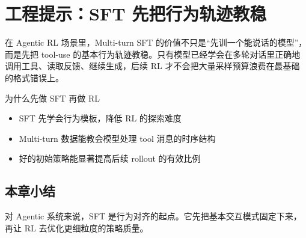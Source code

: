 \section{工程提示：SFT 先把行为轨迹教稳}
在 Agentic RL 场景里，Multi-turn SFT 的价值不只是“先训一个能说话的模型”，而是先把 tool-use 的基本行为轨迹教稳。只有模型已经学会在多轮对话里正确地调用工具、读取反馈、继续生成，后续 RL 才不会把大量采样预算浪费在最基础的格式错误上。

\begin{knowledgebox}{为什么先做 SFT 再做 RL}
\begin{itemize}
  \item SFT 先学会行为模板，降低 RL 的探索难度
  \item Multi-turn 数据能教会模型处理 tool 消息的时序结构
  \item 好的初始策略能显著提高后续 rollout 的有效比例
\end{itemize}
\end{knowledgebox}

\subsection{本章小结}
对 Agentic 系统来说，SFT 是行为对齐的起点。它先把基本交互模式固定下来，再让 RL 去优化更细粒度的策略质量。

\newpage
